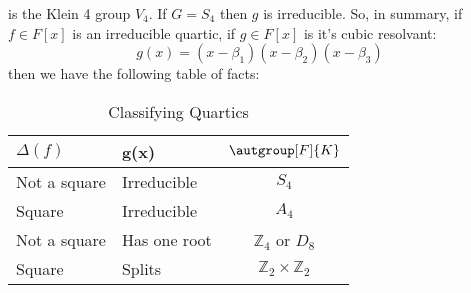     is the Klein 4 group $V_{4}$. If $G=S_{4}$ then $g$ is irreducible.
    So, in summary, if $f\in{F}[x]$ is an irreducible quartic, if
    $g\in{F}[x]$ is it's cubic resolvant:
    \begin{equation}
        g(x)=(x-\beta_{1})(x-\beta_{2})(x-\beta_{3})
    \end{equation}
    then we have the following table of facts:
    \begin{table}[H]
        \centering
        \captionsetup{type=table}
        \begin{tabular}{l|l|c}
            $\Delta(f)$&g(x)&$\autgroup[F]{K}$\\
            \hline
            Not a square&Irreducible&$S_{4}$\\
            Square&Irreducible&$A_{4}$\\
            Not a square&Has one root&$\mathbb{Z}_{4}$ or $D_{8}$\\
            Square&Splits&$\mathbb{Z}_{2}\times\mathbb{Z}_{2}$
        \end{tabular}
        \caption{Classifying Quartics}
    \end{table}
